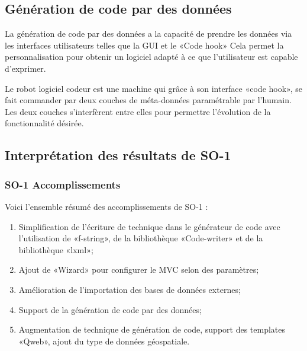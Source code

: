 \subsection{Génération de code par des données}

La génération de code par des données a la capacité de prendre les données via les interfaces utilisateurs telles que la GUI et le «Code hook» Cela permet la personnalisation pour obtenir un logiciel adapté à ce que l’utilisateur est capable d’exprimer.

Le robot logiciel codeur est une machine qui grâce à son interface «code hook», se fait commander par deux couches de méta-données paramétrable par l’humain. Les deux couches s’interfèrent entre elles pour permettre l’évolution de la fonctionnalité désirée.


\subsection{Interprétation des résultats de SO-1}

\subsubsection{SO-1 Accomplissements}
Voici l'ensemble résumé des accomplissements de SO-1 :
\begin{enumerate}
    \item Simplification de l’écriture de technique dans le générateur de code avec l’utilisation de «f-string», de la bibliothèque «Code-writer» et de la bibliothèque «lxml»;
    \item Ajout de «Wizard» pour configurer le MVC selon des paramètres;
    \item Amélioration de l’importation des bases de données externes;
    \item Support de la génération de code par des données;
    \item Augmentation de technique de génération de code, support des templates «Qweb», ajout du type de données géospatiale.
\end{enumerate}

